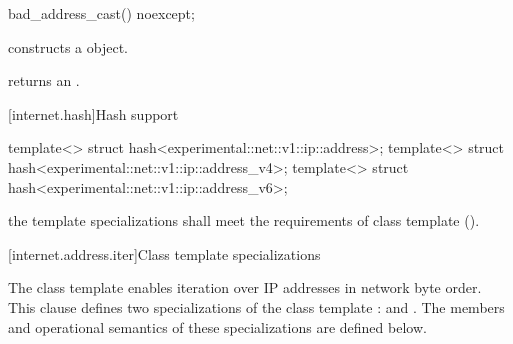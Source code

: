 \begin{itemdecl}
bad_address_cast() noexcept;
\end{itemdecl}

\begin{itemdescr}
\pnum
\effects constructs a  object.

\pnum
\postconditions {} returns an  \ntbs.
\end{itemdescr}



[internet.hash]{Hash support}

\begin{itemdecl}
template<> struct hash<experimental::net::v1::ip::address>;
template<> struct hash<experimental::net::v1::ip::address_v4>;
template<> struct hash<experimental::net::v1::ip::address_v6>;
\end{itemdecl}

\begin{itemdescr}
\pnum
\requires the template specializations shall meet the requirements of class template  ().
\end{itemdescr}



%
[internet.address.iter]{Class template  specializations}

\pnum
The class template  enables iteration over IP addresses in network byte order. This clause defines two specializations of the class template :  and . The members and operational semantics of these specializations are defined below.

